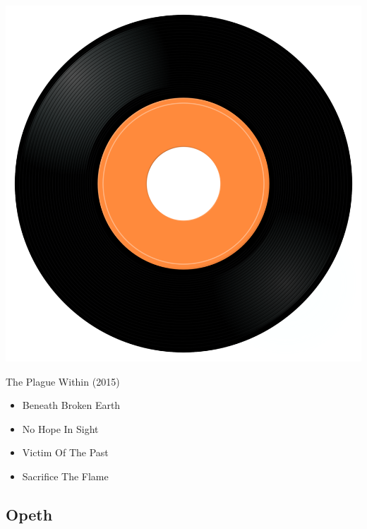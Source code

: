 \begin{minipage}[t]{0.25\textwidth}
\captionsetup{type=figure}
\includegraphics[width=\textwidth]{Images/cover.png}
\caption*{The Plague Within (2015)}
\end{minipage}
\begin{minipage}[t]{0.25\textwidth}\vspace{0pt}
\begin{itemize}[nosep,leftmargin=1em,labelwidth=*,align=left]
	\setlength{\itemsep}{0pt}
	\item Beneath Broken Earth
	\item No Hope In Sight
	\item Victim Of The Past
	\item Sacrifice The Flame
\end{itemize}
\end{minipage}

\subsection{Opeth}

